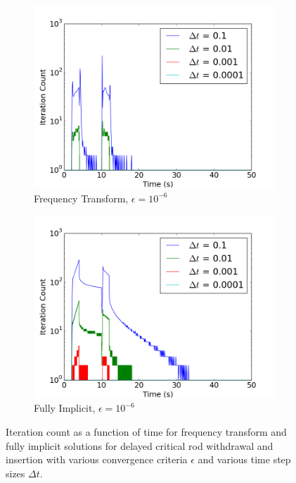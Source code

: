 \documentclass[12pt]{report}
\begin{document}
\begin{figure}[ht]
			\begin{subfigure}{.5\textwidth}
				\centering
				\includegraphics[width=.95\linewidth]{figs/iter_case1_conv2.png}
				\caption{Frequency Transform, $\epsilon = 10^{-6}$}
				\label{fig::iter_1_3_ft}
			\end{subfigure}%
			\begin{subfigure}{.5\textwidth}
				\centering
				\includegraphics[width=.95\linewidth]{figs/iter_case1_conv2_omega0.png}
				\caption{Fully Implicit, $\epsilon = 10^{-6}$}
				\label{fig::iter_1_3_fi}
			\end{subfigure}
			\caption{Iteration count as a function of time for frequency transform and fully implicit solutions for delayed critical rod withdrawal and insertion with various convergence criteria $\epsilon$ and various time step sizes $\Delta t$.}
			\label{fig::iter_1}
		\end{figure}
		
\end{document}
